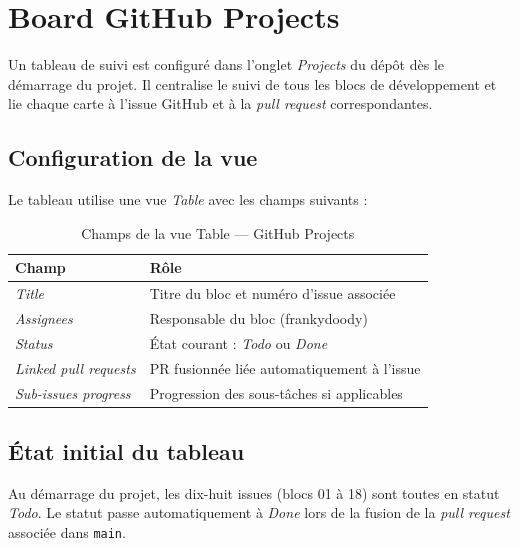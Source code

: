 \documentclass[12pt, a4paper]{article}
\begin{document}
\section{Board GitHub Projects}

Un tableau de suivi est configuré dans l'onglet \textit{Projects}
du dépôt dès le démarrage du projet. Il centralise le suivi
de tous les blocs de développement et lie chaque carte à
l'issue GitHub et à la \textit{pull request} correspondantes.

\subsection{Configuration de la vue}

Le tableau utilise une vue \textit{Table} avec les champs suivants :

\begin{table}[H]
  \centering
  \caption{Champs de la vue Table — GitHub Projects}
  \begin{tabularx}{\textwidth}{lX}
    \toprule
    \textbf{Champ}                  & \textbf{Rôle} \\
    \midrule
    \textit{Title}                  & Titre du bloc et numéro d'issue associée \\
    \textit{Assignees}              & Responsable du bloc (frankydoody) \\
    \textit{Status}                 & État courant : \textit{Todo} ou \textit{Done} \\
    \textit{Linked pull requests}   & PR fusionnée liée automatiquement à l'issue \\
    \textit{Sub-issues progress}    & Progression des sous-tâches si applicables \\
    \bottomrule
  \end{tabularx}
\end{table}

\subsection{État initial du tableau}

Au démarrage du projet, les dix-huit issues (blocs 01 à 18) sont
toutes en statut \textit{Todo}. Le statut passe automatiquement
à \textit{Done} lors de la fusion de la \textit{pull request}
associée dans \texttt{main}.
\end{document}
